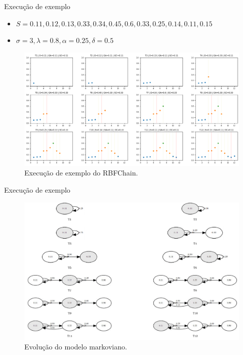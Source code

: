 \documentclass[10pt]{beamer}
\begin{document}
\begin{frame}{Execução de exemplo}
    \begin{itemize}
        \item $S = {0.11, 0.12, 0.13, 0.33, 0.34, 0.45, 0.6, 0.33, 0.25, 0.14, 0.11, 0.15}$
        \item $\sigma = 3, \lambda = 0.8, \alpha = 0.25, \delta = 0.5$
    \end{itemize}
    \begin{figure}[H]
        \begin{center}
            \includegraphics[width=\textwidth]{imagens/funcionamento_algoritmo.png}
            \caption{Execução de exemplo do RBFChain.}
            \label{fig:funcionamento_algoritmo}
        \end{center}
    \end{figure}
\end{frame}

\begin{frame}{Execução de exemplo}
    \begin{figure}[H]
        \begin{center}
            \includegraphics[width=\textwidth]{imagens/evolucao_markov.png}
            \caption{Evolução do modelo markoviano.}
        \label{fig:evolucao_markov}
        \end{center}
    \end{figure}
\end{frame}
\end{document}
